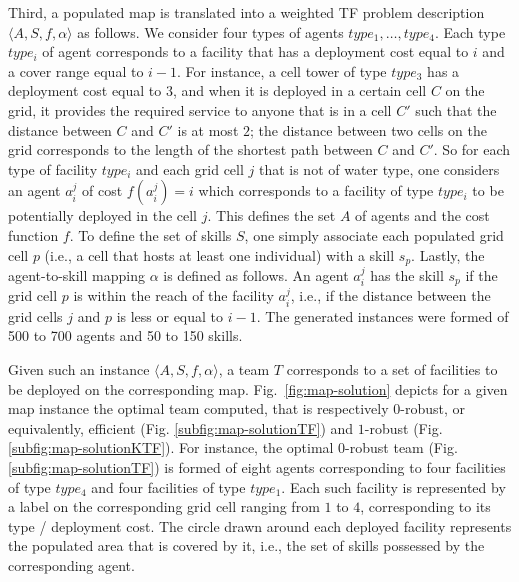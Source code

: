 \documentclass[conference]{IEEEtran}
\theoremstyle{definition}
\begin{document}
Third, a populated map is translated into a weighted TF problem description
 $\langle A, S, f, \alpha\rangle$ as follows.
We consider four types of agents $type_1, \ldots, type_4$. 
Each type $type_i$ of agent corresponds to a facility that has a deployment cost
equal to $i$ and a cover range equal to $i - 1$. For instance, a cell tower 
of type $type_3$ has a deployment cost equal to $3$, and when it is
deployed in a certain cell $C$ on the grid, it provides the required service 
to anyone that is in a cell $C'$ such that the distance between
$C$ and $C'$ is at most $2$; the distance between two cells on the grid corresponds 
to the length of the shortest path
between $C$ and $C'$. So for each type of facility $type_i$ and each grid cell $j$ that is not of water type,
one considers an agent $a_i^j$ of cost $f(a_i^j) = i$ which corresponds to a 
facility of type $type_i$ to be potentially deployed in the cell $j$.
This defines the set $A$ of agents and the cost function $f$.
To define the set of skills $S$,
one simply associate each populated grid cell $p$ 
(i.e., a cell that hosts at least one individual) with a skill $s_p$.
Lastly, the agent-to-skill mapping $\alpha$ is defined as follows. An agent $a_i^j$ 
has the skill $s_p$ if the grid cell $p$ is within the reach of the facility $a_i^j$, 
i.e., if the distance between the grid cells $j$ and $p$ is less or equal to $i - 1$.
The generated instances were formed of 500 to 700 agents and 50 to 150 skills.


Given such an instance $\langle A, S, f, \alpha\rangle$, a team $T$ 
corresponds to a set of facilities to be deployed on the corresponding map.
Fig.~\ref{fig:map-solution} depicts for a given map instance the optimal team computed, that is
respectively $0$-robust, or equivalently, efficient (Fig. \ref{subfig:map-solutionTF}) and $1$-robust (Fig. \ref{subfig:map-solutionKTF}).
For instance, the optimal $0$-robust team (Fig. \ref{subfig:map-solutionTF}) 
is formed of eight agents corresponding to four facilities
of type $type_4$ and four facilities of type $type_1$. Each such facility 
is represented by a label on the corresponding grid cell
ranging from $1$ to $4$, corresponding to its type / deployment cost. 
The circle drawn around each deployed facility represents the populated area
that is covered by it, i.e., the set of skills possessed by the corresponding agent.
\end{document}
